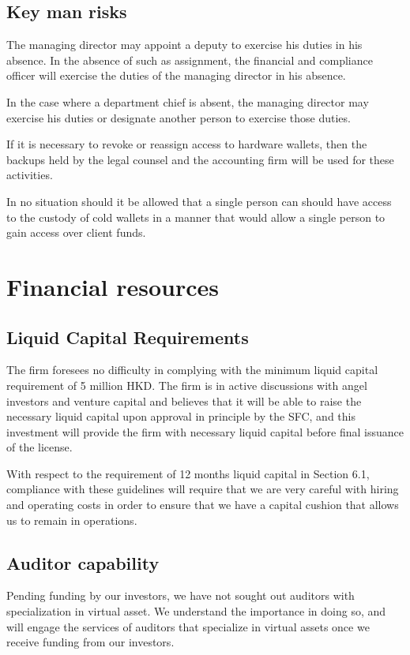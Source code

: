 \subsection{Key man risks}
The managing director may appoint a deputy to exercise his duties in
his absence.  In the absence of such as assignment, the financial and
compliance officer will exercise the duties of the managing director
in his absence.

In the case where a department chief is absent, the managing director
may exercise his duties or designate another person to exercise those
duties.

If it is necessary to revoke or reassign access to hardware wallets,
then the backups held by the legal counsel and the accounting firm
will be used for these activities.

In no situation should it be allowed that a single person can should
have access to the custody of cold wallets in a manner that would allow a
single person to gain access over client funds.

\section{Financial resources}
\subsection{Liquid Capital Requirements}

The firm foresees no difficulty in complying with the minimum liquid
capital requirement of 5 million HKD.  The firm is in active
discussions with angel investors and venture capital and believes that
it will be able to raise the necessary liquid capital upon approval in
principle by the SFC, and this investment will provide the firm with
necessary liquid capital before final issuance of the license.

With respect to the requirement of 12 months liquid capital in Section
6.1, compliance with these guidelines will require that we are very
careful with hiring and operating costs in order to ensure that we
have a capital cushion that allows us to remain in operations.  


\subsection{Auditor capability}
Pending funding by our investors, we have not sought out auditors with
specialization in virtual asset.  We understand the importance in
doing so, and will engage the services of auditors that specialize in
virtual assets once we receive funding from our investors.

